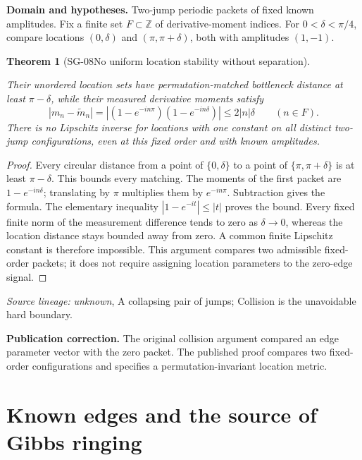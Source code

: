 \documentclass[11pt]{article}
\newtheorem{theorem}{Theorem}[section]
\theoremstyle{definition}\newtheorem{definition}[theorem]{Definition}
\theoremstyle{remark}\newtheorem{remark}[theorem]{Remark}
\begin{document}
\par{\small\textbf{Domain and hypotheses.} Two-jump periodic packets of fixed known amplitudes. Fix a finite set $F\subset\mathbb Z$ of derivative-moment indices. For $0<\delta<\pi/4$, compare locations $(0,\delta)$ and $(\pi,\pi+\delta)$, both with amplitudes $(1,-1)$.}\par
\begin{theorem}[SG-08\quad No uniform location stability without separation]\label{SG-08}

Their unordered location sets have permutation-matched bottleneck distance at
least $\pi-\delta$, while their measured derivative moments satisfy
\[
 |m_n-\widetilde m_n|
 =|(1-e^{-in\pi})(1-e^{-in\delta})|
 \le2|n|\delta\qquad(n\in F).
\]
There is no Lipschitz inverse for locations with one constant on all distinct
two-jump configurations, even at this fixed order and with known amplitudes.

\end{theorem}
\begin{proof}

Every circular distance from a point of $\{0,\delta\}$ to a point of
$\{\pi,\pi+\delta\}$ is at least $\pi-\delta$. This bounds every matching.
The moments of the first packet are $1-e^{-in\delta}$; translating by $\pi$
multiplies them by $e^{-in\pi}$. Subtraction gives the formula.
The elementary inequality $|1-e^{-it}|\le|t|$ proves the bound. Every fixed
finite norm of the measurement difference tends to zero as $\delta\to0$,
whereas the location distance stays bounded away from zero. A common finite
Lipschitz constant is therefore impossible. This argument compares two
admissible fixed-order packets; it does not require assigning location
parameters to the zero-edge signal.

\end{proof}

\par{\small\color{Teal}\textit{Source lineage:} \textit{unknown}, A collapsing pair of jumps; Collision is the unavoidable hard boundary.}\par

\par{\small\textbf{Publication correction.} The original collision argument compared an edge parameter vector with the zero packet. The published proof compares two fixed-order configurations and specifies a permutation-invariant location metric.}\par

\section{Known edges and the source of Gibbs ringing}
\end{document}
